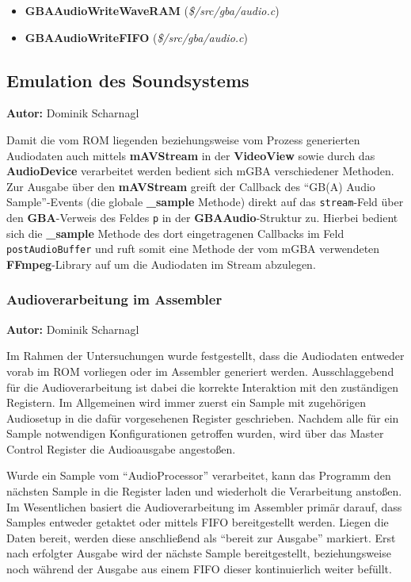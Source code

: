 \documentclass[11pt,a4paper]{scrartcl}
\newcommand{\AutorDominik} {
    \vspace{-4mm}
    \large \textbf{Autor:} Dominik Scharnagl \normalsize
    \vspace{2mm}
}
\begin{document}
\begin{itemize}
    \item \textbf{GBAAudioWriteWaveRAM} (\textit{\$/src/gba/audio.c})
    \item \textbf{GBAAudioWriteFIFO} (\textit{\$/src/gba/audio.c})
\end{itemize}



\subsection{Emulation des Soundsystems} \label{EmulationSoundsystem}
\AutorDominik

Damit die vom ROM liegenden beziehungsweise vom Prozess generierten Audiodaten auch mittels \textbf{mAVStream} in der \textbf{VideoView} sowie durch das \textbf{AudioDevice} verarbeitet werden bedient sich mGBA verschiedener Methoden. Zur Ausgabe \"uber den \textbf{mAVStream} greift der Callback des \enquote{GB(A) Audio Sample}-Events (die globale \textbf{{\_}sample} Methode) direkt auf das \verb|stream|-Feld \"uber den \textbf{GBA}-Verweis des Feldes \verb|p| in der \textbf{GBAAudio}-Struktur zu. Hierbei bedient sich die \textbf{{\_}sample} Methode des dort eingetragenen Callbacks im Feld \verb|postAudioBuffer| und ruft somit eine Methode der vom mGBA verwendeten \textbf{FFmpeg}-Library auf um die Audiodaten im Stream abzulegen.



\subsubsection{Audioverarbeitung im Assembler}
\AutorDominik

Im Rahmen der Untersuchungen wurde festgestellt, dass die Audiodaten entweder vorab im ROM vorliegen oder im Assembler generiert werden. Ausschlaggebend f\"ur die Audioverarbeitung ist dabei die korrekte Interaktion mit den zust\"andigen Registern. Im Allgemeinen wird immer zuerst ein Sample mit zugeh\"origen Audiosetup in die daf\"ur vorgesehenen Register geschrieben. Nachdem alle f\"ur ein Sample notwendigen Konfigurationen getroffen wurden, wird \"uber das Master Control Register die Audioausgabe angesto{\ss}en.

Wurde ein Sample vom \enquote{AudioProcessor} verarbeitet, kann das Programm den n\"achsten Sample in die Register laden und wiederholt die Verarbeitung ansto{\ss}en. Im Wesentlichen basiert die Audioverarbeitung im Assembler prim\"ar darauf, dass Samples entweder getaktet oder mittels FIFO bereitgestellt werden. Liegen die Daten bereit, werden diese anschlie{\ss}end als \enquote{bereit zur Ausgabe} markiert. Erst nach erfolgter Ausgabe wird der n\"achste Sample bereitgestellt, beziehungsweise noch w\"ahrend der Ausgabe aus einem FIFO dieser kontinuierlich weiter bef\"ullt.
\end{document}
